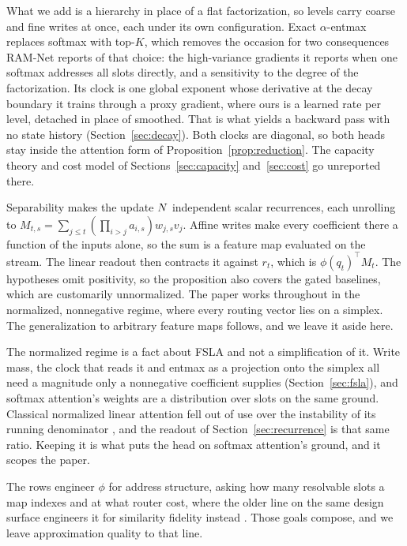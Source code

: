 What we add is a hierarchy in place of a flat factorization, so levels carry coarse and fine writes at once, each under its own configuration. Exact $\alpha$-entmax replaces softmax with top-$K$, which removes the occasion for two consequences RAM-Net reports of that choice: the high-variance gradients it reports when one softmax addresses all slots directly, and a sensitivity to the degree of the factorization. Its clock is one global exponent whose derivative at the decay boundary it trains through a proxy gradient, where ours is a learned rate per level, detached in place of smoothed. That is what yields a backward pass with no state history (Section~\ref{sec:decay}). Both clocks are diagonal, so both heads stay inside the attention form of Proposition~\ref{prop:reduction}. The capacity theory and cost model of Sections~\ref{sec:capacity} and~\ref{sec:cost} go unreported there.

Separability makes the update $N$ independent scalar recurrences, each unrolling to $M_{t,s} = \textstyle\sum_{j \le t} (\prod_{i>j} a_{i,s}) w_{j,s} v_j$. Affine writes make every coefficient there a function of the inputs alone, so the sum is a feature map evaluated on the stream. The linear readout then contracts it against $r_t$, which is $\phi(q_t)^\top M_t$. The hypotheses omit positivity, so the proposition also covers the gated baselines, which are customarily unnormalized. The paper works throughout in the normalized, nonnegative regime, where every routing vector lies on a simplex. The generalization to arbitrary feature maps follows, and we leave it aside here.

The normalized regime is a fact about FSLA and not a simplification of it. Write mass, the clock that reads it and entmax as a projection onto the simplex all need a magnitude only a nonnegative coefficient supplies (Section~\ref{sec:fsla}), and softmax attention's weights are a distribution over slots on the same ground. Classical normalized linear attention fell out of use over the instability of its running denominator \citep{katharopoulos2020}, and the readout of Section~\ref{sec:recurrence} is that same ratio. Keeping it is what puts the head on softmax attention's ground, and it scopes the paper.

The rows engineer $\phi$ for address structure, asking how many resolvable slots a map indexes and at what router cost, where the older line on the same design surface engineers it for similarity fidelity instead \citep{choromanski2021performer, arora2024based, zhang2024hedgehog}. Those goals compose, and we leave approximation quality to that line.

